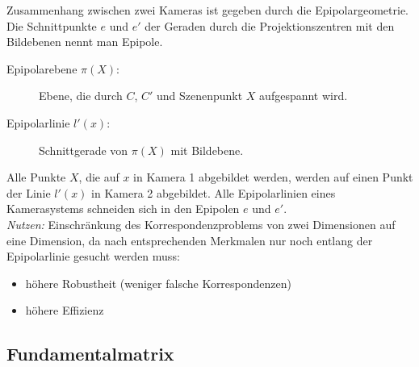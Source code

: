 Zusammenhang zwischen zwei Kameras ist gegeben durch die Epipolargeometrie. Die Schnittpunkte $e$ und $e'$ der Geraden durch die Projektionszentren mit den Bildebenen nennt man Epipole.
\begin{description}
\item[Epipolarebene $\pi(X)$:] Ebene, die durch $C$, $C'$ und Szenenpunkt $X$ aufgespannt wird.
\item[Epipolarlinie $l'(x)$:] Schnittgerade von $\pi(X)$ mit Bildebene.
\end{description}
Alle Punkte $X$, die auf $x$ in Kamera 1 abgebildet werden, werden auf einen Punkt der Linie $l'(x)$ in Kamera 2 abgebildet. Alle Epipolarlinien eines Kamerasystems schneiden sich in den Epipolen $e$ und $e'$. \\
\textsl{Nutzen:} Einschränkung des Korrespondenzproblems von zwei Dimensionen auf eine Dimension, da nach entsprechenden Merkmalen nur noch entlang der Epipolarlinie gesucht werden muss:
\begin{itemize}
\item höhere Robustheit (weniger falsche Korrespondenzen)
\item höhere Effizienz
\end{itemize}

\subsection{Fundamentalmatrix}

